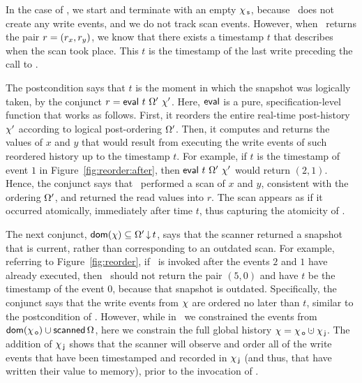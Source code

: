 
In the case of \jyscan, we start and terminate with an empty $\chi_{\, \mathsf{s}}$,
because \jyscan\ does not create any write events, and we do not track
scan events. However, when \jyscan\ returns the pair $r = (r_x,
r_y)$, we know that there exists a timestamp $t$ that describes when
the scan took place. This $t$ is the timestamp of the last write
preceding the call to \jyscan.

The postcondition says that $t$ is the moment in which the snapshot
was logically taken, by the conjunct $r =
\mathsf{eval}\ t\ \Omega'\ \chi'$.  Here, $\mathsf{eval}$ is a pure,
specification-level function that works as follows. First, it reorders
the entire real-time post-history $\chi'$ according to logical
post-ordering $\Omega'$. Then, it computes and returns the
values of $x$ and $y$ that would result from executing the write
events of such reordered history up to the timestamp $t$. For example,
if $t$ is the timestamp of event $1$ in
Figure~\ref{fig:reorder:after}, then $\mathsf{eval}\ t\ \Omega'\ \chi'$
would return $(2, 1)$. Hence, the conjunct says that
\jyscan\ performed a scan of $x$ and $y$, consistent with the ordering
$\Omega'$, and returned the read values into $r$. The scan
appears as if it occurred atomically, immediately after time $t$, thus
capturing the atomicity of \jyscan.


The next conjunct, $\mathsf{dom}(\chi) \subseteq \Omega'\,{\downarrow}\,t$,
says that the scanner returned a snapshot that is current, rather than
corresponding to an outdated scan. For example, referring to
Figure~\ref{fig:reorder}, if \jyscan\ is invoked after the events $2$
and $1$ have already executed, then \jyscan\ should not return the
pair $(5, 0)$ and have $t$ be the timestamp of the event $0$, because
that snapshot is outdated. Specifically, the conjunct says that the
write events from $\chi$ are ordered no later than $t$, similar to
the postcondition of \jywrite. However, while in \jywrite\ we
constrained the events from $\mathsf{dom}(\chi_{\, \mathsf{o}}) \cup \mathsf{scanned}\,\Omega$,
here we constrain the full global history $\hist = \histO \hunion
\histJ$. The addition of $\chi_{\, \mathsf{j}}$ shows that the scanner will observe
and order all of the write events that have been timestamped and
recorded in $\chi_{\, \mathsf{j}}$ (and thus, that have written their value to
memory), prior to the invocation of \jyscan.


